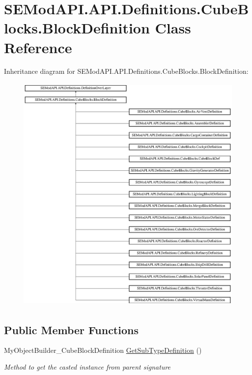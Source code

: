 \hypertarget{class_s_e_mod_a_p_i_1_1_a_p_i_1_1_definitions_1_1_cube_blocks_1_1_block_definition}{}\section{S\+E\+Mod\+A\+P\+I.\+A\+P\+I.\+Definitions.\+Cube\+Blocks.\+Block\+Definition Class Reference}
\label{class_s_e_mod_a_p_i_1_1_a_p_i_1_1_definitions_1_1_cube_blocks_1_1_block_definition}
Inheritance diagram for S\+E\+Mod\+A\+P\+I.\+A\+P\+I.\+Definitions.\+Cube\+Blocks.\+Block\+Definition\+:\begin{figure}[H]
\begin{center}
\leavevmode
\includegraphics[height=12.000000cm]{class_s_e_mod_a_p_i_1_1_a_p_i_1_1_definitions_1_1_cube_blocks_1_1_block_definition}
\end{center}
\end{figure}
\subsection*{Public Member Functions}
\begin{DoxyCompactItemize}
\item 
My\+Object\+Builder\+\_\+\+Cube\+Block\+Definition \hyperlink{class_s_e_mod_a_p_i_1_1_a_p_i_1_1_definitions_1_1_cube_blocks_1_1_block_definition_af91426b5ecc58bce9a283f43174f9f77}{Get\+Sub\+Type\+Definition} ()
\begin{DoxyCompactList}\small\item\em Method to get the casted instance from parent signature \end{DoxyCompactList}\end{DoxyCompactItemize}
